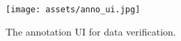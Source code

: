 \begin{figure}[tb!]
    \centering
    \texttt{[image: assets/anno\_ui.jpg]}
    \caption{
        The annotation UI for data verification.
    }
    \label{fig:anno_ui}
\end{figure}

